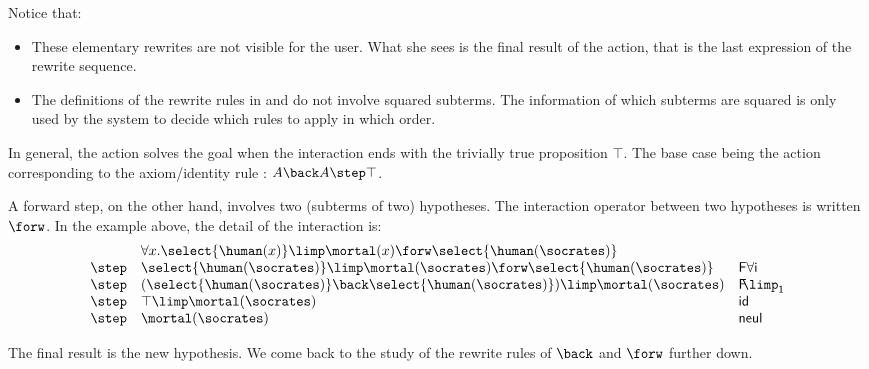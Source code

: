 Notice that:
\begin{itemize}
\item   These elementary rewrites are not visible for the user. What she sees is
  the final result of the action, that is the last expression of the rewrite
  sequence.
\item The definitions of the rewrite rules in  and
   do not involve squared subterms. The information of which
  subterms are squared is only used by the system to decide which rules to
  apply in which order.
\end{itemize}

In general, the action solves the goal when the interaction ends with
the trivially true proposition $\top$. The base case being the action
corresponding to the axiom/identity rule : $A\back A \step\top$.

A forward step, on the other hand, involves two (subterms of two)
hypotheses. The interaction operator between two hypotheses is written
$\forw$. In the example above, the detail of the interaction is:
$$
  \begin{array}{lll}
    &  \forall x .\select{\human(x)}\limp\mortal(x) \forw \select{\human(\socrates)}&\\
    \step & \select{\human(\socrates)}\limp\mortal(\socrates) \forw \select{\human(\socrates)}& \mathsf{F \forall i}\\
    \step & (\select{\human(\socrates)}\back \select{\human(\socrates)} )\limp\mortal(\socrates) &\mathsf{F\!\!\limp_1}\\
    \step & \top \limp\mortal(\socrates) &\mathsf{id}\\
    \step & \mortal(\socrates) & \mathsf{neul}\\
  \end{array}
$$

The final result is the new hypothesis. We come back to the study of the rewrite
rules of ${\back}$ and ${\forw}$ further down.



